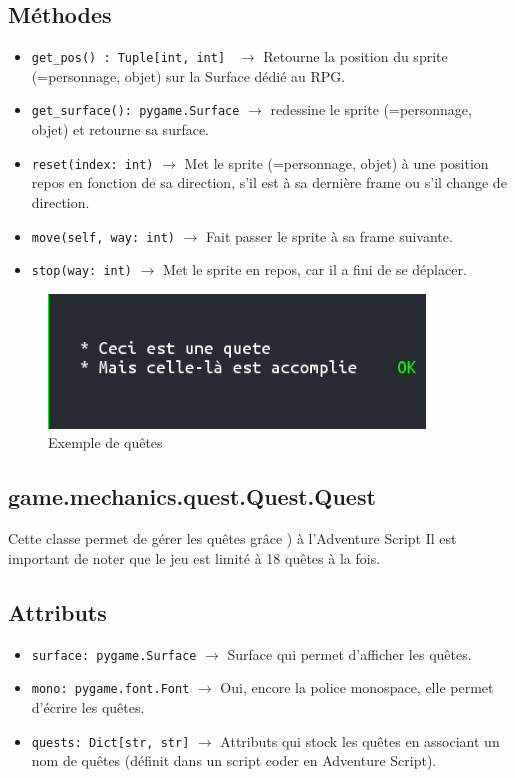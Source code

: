 \documentclass{report}
\begin{document}
\subsection*{Méthodes}
\begin{itemize}
  \item \texttt{get_pos() : Tuple[int, int] }		$\rightarrow$ Retourne la position du sprite (=personnage, objet) sur la Surface dédié au RPG.
  \item \texttt{get_surface(): pygame.Surface}		$\rightarrow$ redessine le sprite (=personnage, objet) et retourne sa surface.
  \item \texttt{reset(index: int)}		$\rightarrow$ Met le sprite (=personnage, objet) à une position repos en fonction de sa direction, s’il est à sa dernière frame ou s’il change de direction.
  \item \texttt{move(self, way: int)}		$\rightarrow$ Fait passer le sprite à sa frame suivante.
  \item \texttt{stop(way: int)}		$\rightarrow$ Met le sprite en repos, car il a fini de se déplacer.
\end{itemize}
\newpage
\begin{figure}[hb!]
  \centering
  \includegraphics[width=10cm]{img/image4}
  \caption{Exemple de quêtes}
  \label{fig:spritesheet}
\end{figure}
\subsection{game.mechanics.quest.Quest.Quest}
Cette classe permet de gérer les quêtes grâce ) à l'Adventure Script Il est important de noter que le jeu est limité à 18 quêtes à la fois.

\subsection*{Attributs}
\begin{itemize}
  \item \texttt{surface: pygame.Surface} $\rightarrow$ Surface qui permet d'afficher les quêtes.
  \item \texttt{mono: pygame.font.Font} $\rightarrow$ Oui, encore la police monospace, elle permet d'écrire les quêtes.
  \item \texttt{quests: Dict[str, str]} $\rightarrow$ Attributs qui stock les quêtes en associant un nom de quêtes (définit dans un script coder en Adventure Script).
\end{itemize}
\end{document}
